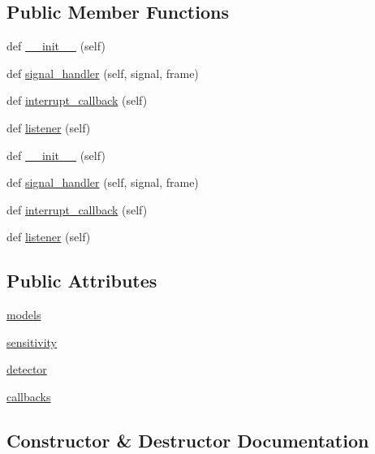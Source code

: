 \subsection*{Public Member Functions}
\begin{DoxyCompactItemize}
\item 
def \hyperlink{classvoiceOLA_1_1SnowBoy_a8e78736d7f6c4bf9bc79aa857c9e1f36}{\+\_\+\+\_\+init\+\_\+\+\_\+} (self)
\item 
def \hyperlink{classvoiceOLA_1_1SnowBoy_a2770703754e331b443acbcc3fe97a5ca}{signal\+\_\+handler} (self, signal, frame)
\item 
def \hyperlink{classvoiceOLA_1_1SnowBoy_a14734dcdb17fbfd5709d3abf47c77e0e}{interrupt\+\_\+callback} (self)
\item 
def \hyperlink{classvoiceOLA_1_1SnowBoy_a0b7f93d9599b0862b67f1ecb3dc56b6e}{listener} (self)
\item 
def \hyperlink{classvoiceOLA_1_1SnowBoy_a8e78736d7f6c4bf9bc79aa857c9e1f36}{\+\_\+\+\_\+init\+\_\+\+\_\+} (self)
\item 
def \hyperlink{classvoiceOLA_1_1SnowBoy_a2770703754e331b443acbcc3fe97a5ca}{signal\+\_\+handler} (self, signal, frame)
\item 
def \hyperlink{classvoiceOLA_1_1SnowBoy_a14734dcdb17fbfd5709d3abf47c77e0e}{interrupt\+\_\+callback} (self)
\item 
def \hyperlink{classvoiceOLA_1_1SnowBoy_a0b7f93d9599b0862b67f1ecb3dc56b6e}{listener} (self)
\end{DoxyCompactItemize}
\subsection*{Public Attributes}
\begin{DoxyCompactItemize}
\item 
\hyperlink{classvoiceOLA_1_1SnowBoy_aaa4dad2978716142ba8097884afcc517}{models}
\item 
\hyperlink{classvoiceOLA_1_1SnowBoy_af19c996792bb8af65dc007390d59c459}{sensitivity}
\item 
\hyperlink{classvoiceOLA_1_1SnowBoy_a5be49a0ae11c7b41494cf42ecf26e88b}{detector}
\item 
\hyperlink{classvoiceOLA_1_1SnowBoy_a0fc25862a15ea5722de0a5aea15143cb}{callbacks}
\end{DoxyCompactItemize}


\subsection{Constructor \& Destructor Documentation}
